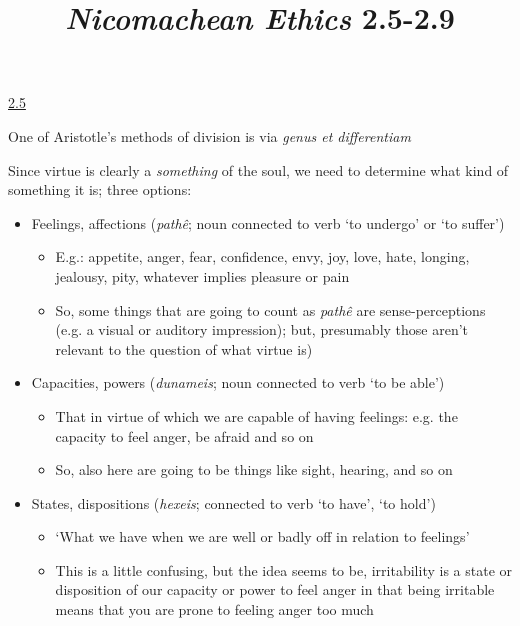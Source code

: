 \documentclass[11pt]{article}
\title{\emph{Nicomachean Ethics} 2.5-2.9}
\author{}
\date{}
\begin{document}
\maketitle

\noindent\underline{2.5}
\vspace*{2mm}

\noindent One of Aristotle's methods of division is via \emph{genus et differentiam}
\vspace*{2mm}

\noindent Since virtue is clearly a \emph{something} of the soul, we need to determine what kind of something it is; three options:

\begin{itemize}\item{Feelings, affections (\emph{path\^{e}}; noun connected to verb `to undergo' or `to suffer')}\begin{itemize}\item{E.g.: appetite, anger, fear, confidence, envy, joy, love, hate, longing, jealousy, pity, whatever implies pleasure or pain}\item{So, some things that are going to count as \emph{path\^{e}} are sense-perceptions (e.g. a visual or auditory impression); but, presumably those aren't relevant to the question of what virtue is)}\end{itemize}

\item{Capacities, powers (\emph{dunameis}; noun connected to verb `to be able')}\begin{itemize}\item{That in virtue of which we are capable of having feelings: e.g. the capacity to feel anger, be afraid and so on}\item{So, also here are going to be things like sight, hearing, and so on}\end{itemize}

\item{States, dispositions (\emph{hexeis}; connected to verb `to have', `to hold')}\begin{itemize}\item{`What we have when we are well or badly off in relation to feelings'}\item{This is a little confusing, but the idea seems to be, irritability is a state or disposition of our capacity or power to feel anger in that being irritable means that you are prone to feeling anger too much}\end{itemize}
\end{itemize}
\end{document}
